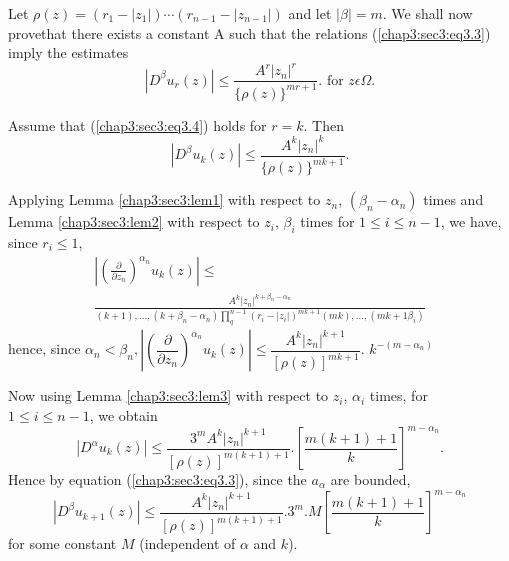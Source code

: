  Let $\rho (z) = (r_1 - |z_1|) \cdots (r_{n-1} - |z_{n-1}|)$ and let
 $|\beta| = m$. We shall now prove\pageoriginale that there exists a constant A such
 that the relations (\ref{chap3:sec3:eq3.3}) imply the estimates 
 \begin{equation}
   \left| D^\beta u_r (z) \right| \le \frac{A^r |z_n|^r}{ \{\rho
     (z)\}^{mr+1}}.\text{ for } z \epsilon \Omega
   . \tag{3.4}\label{chap3:sec3:eq3.4}   
 \end{equation} 
 
Assume that (\ref{chap3:sec3:eq3.4}) holds for $r=k$. Then
$$
\left| D^\beta u_k (z) \right| \le \frac{A^k |z_n|^k}{ \{\rho
  (z)\}^{mk+1}}. 
$$

Applying Lemma \ref{chap3:sec3:lem1} with respect to $z_n$, $(\beta_n - \alpha_n)$
 times and Lemma \ref{chap3:sec3:lem2} with respect to $z_i$, $\beta_i$ times for $1 \le
 i \le n-1$, we have, since $r_i \le 1$, 
 \begin{multline*}
 \left| \left(\frac{\partial} {\partial z_n}\right)^{\alpha_n} u_k (z)
 \right| \le\\ 
 \frac{A^k |z_n|^{k+\beta_n -\alpha_n}}{(k+1) ,\ldots, (k+\beta_n
   -\alpha_n) \prod\limits_{q}^{n-1} (r_i - |z_i|)^{mk+1} (mk) ,\ldots,
   (mk +1 \beta_i)}  
\end{multline*}
hence, since $\alpha_n < \beta_n, \left| \left(\dfrac{\partial} {\partial
   z_n}\right)^{\alpha_n} u_k (z)\right| \le \dfrac{A^k |z_n| ^{k+1}} {[\rho
     (z)]^{mk+1}}$. $k^{-(m-\alpha_n)}$ 

  Now using Lemma \ref{chap3:sec3:lem3}  with respect to $z_i$, $\alpha_i$ times, for $1
  \le i \le n-1$, we obtain 
 $$
 \left| D^\alpha u_k (z)\right| \le \frac{3^m A^k |z_n|^{k+1}} {[\rho
     (z)] ^{m(k+1)+1}}. \left[\frac{m(k+1) +1} {k}\right]^{m-\alpha_n}. 
 $$
  Hence by equation (\ref{chap3:sec3:eq3.3}), since the $a_\alpha$ are bounded,
 $$
 \left| D^\beta u_{k+1} (z)\right| \le \frac{A^k |z_n|^{k+1}} {[\rho
     (z)] ^{m(k+1)+1}}. 3^m. M \left[\frac{m(k+1) +1}
   {k}\right]^{m-\alpha_n} 
 $$
 for some constant $M$ (independent of $\alpha$ and $k$).
 
